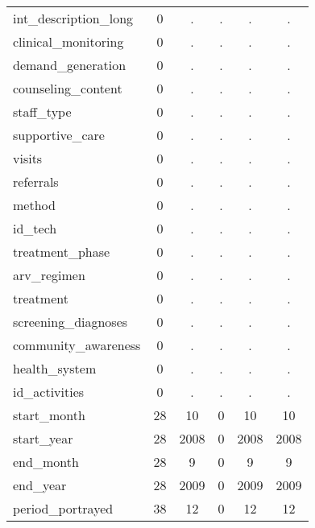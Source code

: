 \begin{table}[htbp]
\begin{tabular}{l*{1}{ccccc}}
int\_description\_long&           0&           .&           .&           .&           .\\
clinical\_monitoring&           0&           .&           .&           .&           .\\
demand\_generation&           0&           .&           .&           .&           .\\
counseling\_content&           0&           .&           .&           .&           .\\
staff\_type  &           0&           .&           .&           .&           .\\
supportive\_care&           0&           .&           .&           .&           .\\
visits      &           0&           .&           .&           .&           .\\
referrals   &           0&           .&           .&           .&           .\\
method      &           0&           .&           .&           .&           .\\
id\_tech     &           0&           .&           .&           .&           .\\
treatment\_phase&           0&           .&           .&           .&           .\\
arv\_regimen &           0&           .&           .&           .&           .\\
treatment   &           0&           .&           .&           .&           .\\
screening\_diagnoses&           0&           .&           .&           .&           .\\
community\_awareness&           0&           .&           .&           .&           .\\
health\_system&           0&           .&           .&           .&           .\\
id\_activities&           0&           .&           .&           .&           .\\
start\_month &          28&          10&           0&          10&          10\\
start\_year  &          28&        2008&           0&        2008&        2008\\
end\_month   &          28&           9&           0&           9&           9\\
end\_year    &          28&        2009&           0&        2009&        2009\\
period\_portrayed&          38&          12&           0&          12&          12\\

\end{tabular}
\end{table}

